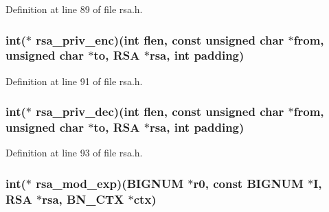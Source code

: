 Definition at line 89 of file rsa.\+h.

\subsubsection[{\texorpdfstring{rsa\+\_\+priv\+\_\+enc}{rsa_priv_enc}}]{\setlength{\rightskip}{0pt plus 5cm}int($\ast$ rsa\+\_\+priv\+\_\+enc)(int flen, const unsigned char $\ast$from, unsigned char $\ast$to, {\bf R\+SA} $\ast$rsa, int padding)}\hypertarget{structrsa__meth__st_a2a26ad2abad414c004105b98d6831239}{}\label{structrsa__meth__st_a2a26ad2abad414c004105b98d6831239}


Definition at line 91 of file rsa.\+h.

\subsubsection[{\texorpdfstring{rsa\+\_\+priv\+\_\+dec}{rsa_priv_dec}}]{\setlength{\rightskip}{0pt plus 5cm}int($\ast$ rsa\+\_\+priv\+\_\+dec)(int flen, const unsigned char $\ast$from, unsigned char $\ast$to, {\bf R\+SA} $\ast$rsa, int padding)}\hypertarget{structrsa__meth__st_ac9e2e6498c75d60918a1fdb8b889be3a}{}\label{structrsa__meth__st_ac9e2e6498c75d60918a1fdb8b889be3a}


Definition at line 93 of file rsa.\+h.

\subsubsection[{\texorpdfstring{rsa\+\_\+mod\+\_\+exp}{rsa_mod_exp}}]{\setlength{\rightskip}{0pt plus 5cm}int($\ast$ rsa\+\_\+mod\+\_\+exp)({\bf B\+I\+G\+N\+UM} $\ast$r0, const {\bf B\+I\+G\+N\+UM} $\ast${\bf I}, {\bf R\+SA} $\ast$rsa, {\bf B\+N\+\_\+\+C\+TX} $\ast$ctx)}\hypertarget{structrsa__meth__st_a88f188147ee4471bc6286ca125be2f53}{}\label{structrsa__meth__st_a88f188147ee4471bc6286ca125be2f53}


